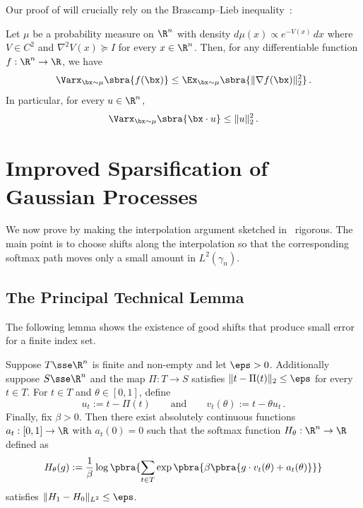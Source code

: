 \documentclass[11pt]{article}
\begin{document}
Our proof of  will crucially rely on the Brascamp--Lieb inequality~\cite{BrascampLieb:76}: 

\begin{lemma} \label{thm:BL}
	Let $\mu$ be a probability measure on $\R^n$ with density $d\mu(x) \propto e^{-V(x)}\,dx$ where $V\in C^2$ and $\nabla^2 V(x)\succeq I$ for every $x\in\R^n$. 
	Then, for any differentiable function $f:\R^n\to\R$, we have
	\[
		\Varx_{\bx\sim\mu}\sbra{f(\bx)}
		\leq 
		\Ex_{\bx\sim\mu}\sbra{\|\nabla f(\bx)\|_2^2}\,.
	\]
	In particular, for every $u\in\R^n$,
	\[
		\Varx_{\bx\sim\mu}\sbra{\bx\cdot u}
		\leq 
		\|u\|_2^2\,.
	\]
\end{lemma}

\section{Improved Sparsification of Gaussian Processes}
\label{sec:GP-sparsification}


We now prove  by making the interpolation argument sketched in~ rigorous.
The main point is to choose shifts along the interpolation so that the corresponding softmax path moves only a small amount in $L^2(\gamma_n)$. 

\subsection{The Principal Technical Lemma}
\label{subsec:collapse-lemma}

The following lemma shows the existence of good shifts that produce small error for a finite index set. 

\begin{lemma} \label{lem:soft-active-clustering}
	Suppose $T \sse \R^n$ is finite and non-empty and let $\eps > 0$. 
	Additionally suppose $S \sse \R^n$ and the map $\Pi : T \to S$ satisfies $\|t - \Pi(t)\|_2 \leq \eps$ for every $t\in T$. 
	For $t \in T$ and $\theta \in [0,1]$, define 
	\[
		u_t := t - \Pi(t) 
		\qquad\text{and}\qquad 
		v_t(\theta) := t - \theta u_t\,. 
	\]
	Finally, fix $\beta > 0$. 
	Then there exist absolutely continuous functions $a_t : [0,1] \to \R$ with $a_t(0) = 0$ such that the softmax function $H_\theta : \R^n \to \R$ defined as 
	\begin{equation} \label{eq:softmax-def}
		H_\theta(g) := \frac{1}{\beta}\log\pbra{\sum_{t\in T} \exp\pbra{\beta\pbra{g\cdot v_t(\theta)+a_t(\theta)}}}
	\end{equation}
	satisfies $\|H_1-H_0\|_{L^2} \leq \eps$. 
\end{lemma}
\end{document}
